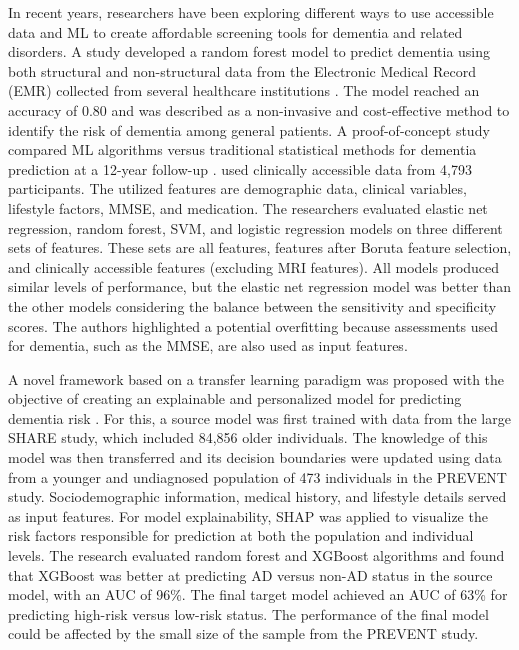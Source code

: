 In recent years, researchers have been exploring different ways to use accessible data and ML to create affordable screening tools for dementia and related disorders. A study developed a random forest model to predict dementia using both structural and non-structural data from the Electronic Medical Record (\acrshort{EMR}) collected from several healthcare institutions \cite{Ben2020Predicting}. The model reached an accuracy of 0.80 and was described as a non-invasive and cost-effective method to identify the risk of dementia among general patients. A proof-of-concept study compared ML algorithms versus traditional statistical methods for dementia prediction at a 12-year follow-up \cite{Twait2023Dementia}. \citeauthor{Twait2023Dementia} used clinically accessible data from 4,793 participants. The utilized features are demographic data, clinical variables, lifestyle factors, MMSE, and medication. The researchers evaluated elastic net regression, random forest, SVM, and logistic regression models on three different sets of features. These sets are all features, features after Boruta feature selection, and clinically accessible features (excluding MRI features). All models produced similar levels of performance, but the elastic net regression model was better than the other models considering the balance between the sensitivity and specificity scores. The authors highlighted a potential overfitting because assessments used for dementia, such as the MMSE, are also used as input features.

A novel framework based on a transfer learning paradigm was proposed with the objective of creating an explainable and personalized model for predicting dementia risk \cite{Danso2021Developing}. For this, a source model was first trained with data from the large SHARE study, which included 84,856 older individuals. The knowledge of this model was then transferred and its decision boundaries were updated using data from a younger and undiagnosed population of 473 individuals in the PREVENT study. Sociodemographic information, medical history, and lifestyle details served as input features. For model explainability, SHAP was applied to visualize the risk factors responsible for prediction at both the population and individual levels. The research evaluated random forest and XGBoost algorithms and found that XGBoost was better at predicting AD versus non-AD status in the source model, with an AUC of 96\%. The final target model achieved an AUC of 63\% for predicting high-risk versus low-risk status. The performance of the final model could be affected by the small size of the sample from the PREVENT study.

